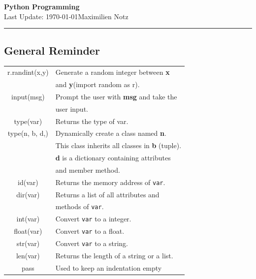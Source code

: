 \documentclass[5pt]{article}
\begin{document}
\begin{center}
     \Large{\textbf{Python Programming}}\\
     \small{Last Update: \today}\hfill\small{\textcopyright Maximilien Notz \the\year{}}
     \noindent\rule{20.2cm}{0.4pt}
\end{center}


\begin{multicols}{2}
\setcounter{secnumdepth}{0}

\subsection{General Reminder}

\begin{tabular}{C L}
        r.randint(x,y)      & Generate a random integer between \textbf{x}\\
                            & and \textbf{y}(import random as r).\\
        input(msg)          & Prompt the user with \textbf{msg} and take the\\
                            & user input.\\
        type(var)           & Returns the type of var.\\
        type(n, b, d,)      & Dynamically create a class named \textbf{n}.\\
                            & This class inherits all classes in \textbf{b} (tuple).\\
                            & \textbf{d} is a dictionary containing attributes\\
                            & and member method.\\
        id(var)             & Returns the memory address of \texttt{var}.\\
        dir(var)            & Returns a list of all attributes and\\
                            & methods of \texttt{var}.\\
        int(var)            & Convert \texttt{var} to a integer.\\
        float(var)          & Convert \texttt{var} to a float.\\
        str(var)            & Convert \texttt{var} to a string.\\
        len(var)            & Returns the length of a string or a list.\\
        pass                & Used to keep an indentation empty\\

\end{tabular}
\end{multicols}
\end{document}
